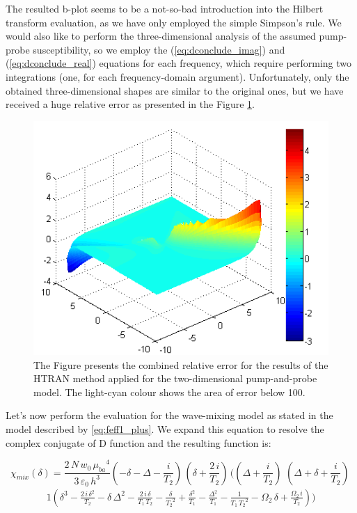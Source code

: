 \documentclass[12pt,twoside,a4paper]{article}
\numberwithin{equation}{subsection}
\numberwithin{figure}{subsection}
\begin{document}
The resulted b-plot seems to be a not-so-bad introduction into the Hilbert transform evaluation, as we have only employed the
simple Simpson's rule. We would also like to perform the three-dimensional analysis of the assumed pump-probe susceptibility, so we
employ the (\ref{eq:dconclude_imag}) and (\ref{eq:dconclude_real}) equations for each frequency, which require performing two
integrations (one, for each frequency-domain argument). Unfortunately, only the obtained three-dimensional shapes are similar to the original ones, but we have received a huge relative
error as presented in the Figure \ref{fig:htran_pnp_3derr}.

\begin{figure}
  \includegraphics{img/htran_pnp_3derr.png}
  \caption{The Figure presents the combined relative error for the results of the HTRAN method applied for the two-dimensional
  pump-and-probe model. The light-cyan colour shows the area of error below 100. \label{fig:htran_pnp_3derr}}
\end{figure} %

Let's now perform the evaluation for the wave-mixing model as stated in the model described by \ref{eq:feff1_plus}. We expand this
equation to resolve the complex conjugate of D function and the resulting function is:

\begin{equation} \label{eq:htran_feffexp}
  {\chi_{mix}}(\delta ) = 
    \frac{2\,N\,{w_{0}}\,{\mu_{ba}}^{4}}{3\,\varepsilon_0\,h^{3}}( - \delta - \Delta - \frac {i}{{T_{2}}})\,(\delta +
    \frac{2\,i}{{T_{2}}})\,((\Delta + \frac {i}{{T_{2}}})\,\,(\Delta + \delta + \frac {i}{{T_{2}}})\,
\end{equation}
\begin{alignat*}{1}
  (\delta ^{3} - \frac
    {2\,i\,\delta ^{2}}{{T _{2}}} - \delta \,\Delta ^{2} - \frac {2\,i\,\delta }{{T_{1}}\,{T_{2}}} - \frac {\delta }{{T_{2}}^{2}} +
    \frac {\delta ^{2}}{{T_{1 }}} - \frac {\Delta ^{2}}{{T_{1}}} - \frac {1}{{T_{1}}\,{T_{2}}^{2}} - {\Omega_{2}}\,\delta  + \frac
    {{\Omega_{2}}\,i}{{T_{2}}}) )
\end{alignat*}
\end{document}
